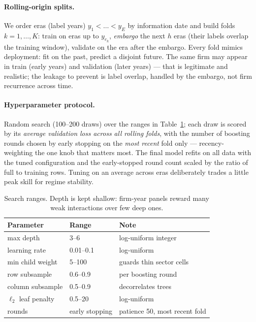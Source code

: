 \paragraph{Rolling-origin splits.}
We order eras (label years) $y_1 < \dots < y_E$ by information date and build folds
$k = 1, \dots, K$: train on eras up to $y_{e_k}$, \emph{embargo} the next $h$ eras (their
labels overlap the training window), validate on the era after the embargo. Every fold
mimics deployment: fit on the past, predict a disjoint future. The same firm may appear
in train (early years) and validation (later years) --- that is legitimate and realistic;
the leakage to prevent is label overlap, handled by the embargo, not firm recurrence
across time.

\paragraph{Hyperparameter protocol.}
Random search (100--200 draws) over the ranges in Table~\ref{tab:xgb-hparams}; each draw
is scored by its \emph{average validation loss across all rolling folds}, with the number
of boosting rounds chosen by early stopping on the \emph{most recent} fold only ---
recency-weighting the one knob that matters most. The final model refits on all data with
the tuned configuration and the early-stopped round count scaled by the ratio of full to
training rows. Tuning on an average across eras deliberately trades a little peak skill
for regime stability.

\begin{table}[htbp]
\centering
\caption{Search ranges. Depth is kept shallow: firm-year panels reward many weak
interactions over few deep ones.}
\label{tab:xgb-hparams}
\begin{tabular}{@{}lll@{}}
\toprule
Parameter & Range & Note \\
\midrule
max depth & 3--6 & log-uniform integer \\
learning rate & 0.01--0.1 & log-uniform \\
min child weight & 5--100 & guards thin sector cells \\
row subsample & 0.6--0.9 & per boosting round \\
column subsample & 0.5--0.9 & decorrelates trees \\
$\ell_2$ leaf penalty & 0.5--20 & log-uniform \\
rounds & early stopping & patience 50, most recent fold \\
\bottomrule
\end{tabular}
\end{table}

